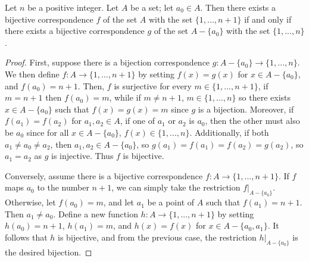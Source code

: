     \begin{lemma}
        Let $n$ be a positive integer. Let $A$ be a set; let $a_0 \in A$. Then there exists a bijective correspondence $f$ of the set $A$ with the set $\{1,...,n+1\}$ if and only if there exists a bijective correspondence $g$ of the set $A-\{a_0\}$ with the set $\{1,...,n\}$.
    \end{lemma}
    \begin{proof}
        First, suppose there is a bijection correspondence $g:A-\{a_0\}\rightarrow \{1,...,n\}$. We then define $f:A\rightarrow \{1,...,n+1\}$ by setting $f(x) = g(x)$ for $x \in A-\{a_0\}$, and $f(a_0) = n+1$. Then, $f$ is surjective for every $m \in \{1,...,n+1\}$, if $m = n+1$ then $f(a_0) = m$, while if $m \neq n+1$, $m \in \{1,...,n\}$ so there exists $x \in A-\{a_0\}$ such that $f(x) = g(x) = m$ since $g$ is a bijection. Moreover, if $f(a_1) = f(a_2)$ for $a_1,a_2 \in A$, if one of $a_1$ or $a_2$ is $a_0$, then the other must also be $a_0$ since for all $x \in A-\{a_0\}$, $f(x) \in \{1,...,n\}$. Additionally, if both $a_1 \neq a_0 \neq a_2$, then $a_1,a_2 \in A-\{a_0\}$, so $g(a_1) = f(a_1) = f(a_2) = g(a_2)$, so $a_1 = a_2$ as $g$ is injective. Thus $f$ is bijective. 

        Conversely, assume there is a bijective correspondence $f:A\rightarrow \{1,...,n+1\}$. If $f$ maps $a_0$ to the number $n+1$, we can simply take the restriction $f\rvert_{A-\{a_0\}}$. Otherwise, let $f(a_0) = m$, and let $a_1$ be a point of $A$ such that $f(a_1) = n+1$. Then $a_1 \neq a_0$. Define a new function $h:A\rightarrow \{1,...,n+1\}$ by setting $h(a_0) = n+1$, $h(a_1) = m$, and $h(x) = f(x)$ for $x \in A-\{a_0,a_1\}$. It follows that $h$ is bijective, and from the previous case, the restriction $h\rvert_{A-\{a_0\}}$ is the desired bijection.
    \end{proof}


